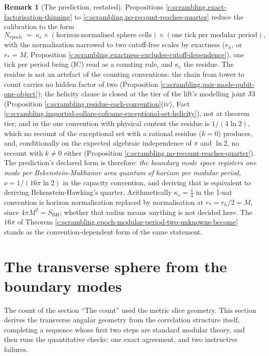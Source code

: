 \documentclass[11pt]{article}
\theoremstyle{definition}
\newtheorem{remark}[theorem]{Remark}
\theoremstyle{plain}
\providecommand{\SBH}{}\renewcommand{\SBH}{S_{\mathrm{BH}}}
\begin{document}
\begin{remark}[The prediction, restated]\label{c:note.scrambling.prediction-restated}
Propositions \ref{c:scrambling.exact-factorisation-thinning} to \ref{c:scrambling.no-recount-reaches-quarter} reduce the calibration to the form
\[
N_{\mathrm{epoch}} \;=\; \kappa_c \times (\text{horizon-normalised sphere cells}) \times (\text{one tick per modular period}),
\]
with the normalisation narrowed to two cutoff-free scales by exactness ($r_h$, or $r_* = M$, Proposition \ref{c:scrambling.exactness-excludes-cutoff-dependence}), one tick per period being (IC) read as a counting rule, and $\kappa_c$ the residue. The residue is not an artefact of the counting conventions: the chain from tower to count carries no hidden factor of two (Proposition \ref{c:scrambling.pair-mode-qubit-one-object}); the helicity clause is closed at the tier of the lift's modelling joint J3 (Proposition \ref{c:scrambling.residue-each-convention}(iv), Fact \ref{c:scrambling.imported-collars-coframe-exceptional-set-helicity}), not at theorem tier; and in the one convention with physical content the residue is $1/(4\ln 2)$, which no recount of the exceptional set with a rational residue ($k = 0$) produces, and, conditionally on the expected algebraic independence of $\pi$ and $\ln 2$, no recount with $k \neq 0$ either (Proposition \ref{c:scrambling.no-recount-reaches-quarter}). The prediction's declared form is therefore: \emph{the boundary mode space registers one mode per Bekenstein-Mukhanov area quantum of horizon per modular period}, $\nu = 1/(16\pi\ln 2)$ in the capacity convention, and deriving that is equivalent to deriving Bekenstein-Hawking's quarter. Arithmetically $\kappa_c = \tfrac14$ in the 1-nat convention is horizon normalisation replaced by normalisation at $r_* = r_h/2 = M$, since $4\pi M^2 = \SBH$; whether that radius means anything is not decided here. The $16\pi$ of Theorem \ref{c:scrambling.epoch-modular-period-two-unknowns-become} stands as the convention-dependent form of the same statement.
\end{remark}

\section{The transverse sphere from the boundary modes}

\label{c:note.scrambling.setting-transverse-sphere-boundary-modes}
The count of the section ``The count'' used the metric slice geometry. This section derives the transverse angular geometry from the correlation structure itself, completing a sequence whose first two steps are standard modular theory, and then runs the quantitative checks: one exact agreement, and two instructive failures.
\end{document}
